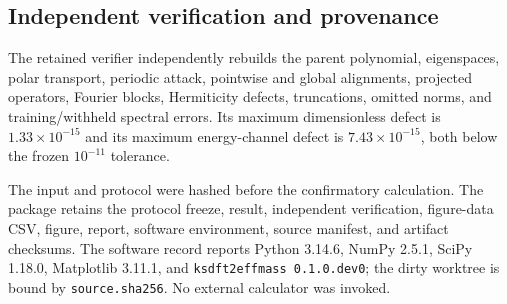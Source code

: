 \subsection{Independent verification and provenance}

The retained verifier independently rebuilds the parent polynomial,
eigenspaces, polar transport, periodic attack, pointwise and global
alignments, projected operators, Fourier blocks, Hermiticity defects,
truncations, omitted norms, and training/withheld spectral errors. Its maximum
dimensionless defect is $1.33\times10^{-15}$ and its maximum energy-channel
defect is $7.43\times10^{-15}$, both below the frozen $10^{-11}$ tolerance.

The input and protocol were hashed before the confirmatory calculation. The
package retains the protocol freeze, result, independent verification,
figure-data CSV, figure, report, software environment, source manifest, and
artifact checksums. The software record reports Python 3.14.6, NumPy 2.5.1,
SciPy 1.18.0, Matplotlib 3.11.1, and \texttt{ksdft2effmass 0.1.0.dev0}; the
dirty worktree is bound by \texttt{source.sha256}. No external calculator was
invoked.
